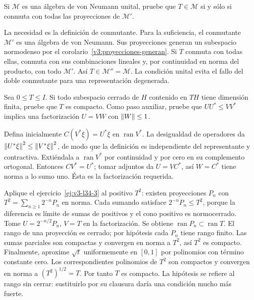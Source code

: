 \begin{ejercicio}\label{ej:v3-l34-4}
Si $\mathcal M$ es una álgebra de von Neumann unital, pruebe que $T\in\mathcal M$ si y sólo si conmuta con todas las proyecciones de $\mathcal M'$.
\end{ejercicio}
\begin{solucion}
La necesidad es la definición de conmutante. Para la suficiencia, el conmutante $\mathcal M'$ es una álgebra de von Neumann. Sus proyecciones generan un subespacio normodenso por el corolario~\ref{v3:proyecciones-generan}. Si $T$ conmuta con todas ellas, conmuta con sus combinaciones lineales y, por continuidad en norma del producto, con todo $\mathcal M'$. Así $T\in\mathcal M''=\mathcal M$. La condición unital evita el fallo del doble conmutante para una representación degenerada.
\end{solucion}

\begin{ejercicio}\label{ej:v3-l34-5}
Sea $0\le T\le I$. Si todo subespacio cerrado de $H$ contenido en $TH$ tiene dimensión finita, pruebe que $T$ es compacto. Como paso auxiliar, pruebe que $UU^*\le VV^*$ implica una factorización $U=VW$ con $\left\lVert W\right\rVert\le1$.
\end{ejercicio}
\begin{solucion}
Defina inicialmente $C(V^*\xi)=U^*\xi$ en $\operatorname{ran}V^*$. La desigualdad de operadores da $\left\lVert U^*\xi\right\rVert^2\le\left\lVert V^*\xi\right\rVert^2$, de modo que la definición es independiente del representante y contractiva. Extiéndala a $\overline{\operatorname{ran}V^*}$ por continuidad y por cero en su complemento ortogonal. Entonces $CV^*=U^*$; tomar adjuntos da $U=VC^*$, así $W=C^*$ tiene norma a lo sumo uno. Ésta es la factorización requerida.

Aplique el ejercicio~\ref{ej:v3-l34-3} al positivo $T^2$: existen proyecciones $P_n$ con $T^2=\sum_{n\ge1}2^{-n}P_n$ en norma. Cada sumando satisface $2^{-n}P_n\le T^2$, porque la diferencia es límite de sumas de positivos y el cono positivo es normocerrado. Tome $U=2^{-n/2}P_n$, $V=T$ en la factorización. Se obtiene $\operatorname{ran}P_n\subset\operatorname{ran}T$. El rango de una proyección es cerrado; por hipótesis cada $P_n$ tiene rango finito. Las sumas parciales son compactas y convergen en norma a $T^2$, así $T^2$ es compacto. Finalmente, aproxime $\sqrt t$ uniformemente en $[0,1]$ por polinomios con término constante cero. Los correspondientes polinomios de $T^2$ son compactos y convergen en norma a $(T^2)^{1/2}=T$. Por tanto $T$ es compacto. La hipótesis se refiere al rango sin cerrar: sustituirlo por su clausura daría una condición mucho más fuerte.
\end{solucion}

